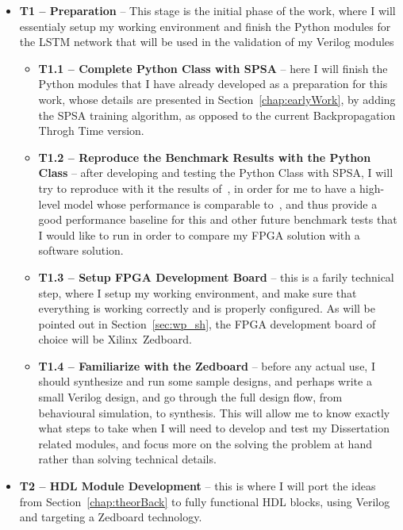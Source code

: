 \begin{itemize}
    \item \textbf{T1 -- Preparation} -- This stage is the initial phase of the work, where I will essentialy setup my working environment and finish the Python modules for the LSTM network that will be used in the validation of my Verilog modules

        \begin{itemize}
            \item \textbf{T1.1 -- Complete Python Class with SPSA} -- here I will finish the Python modules that I have already developed as a preparation for this work, whose details are presented in Section~\ref{chap:earlyWork}, by adding the SPSA training algorithm, as opposed to the current Backpropagation Throgh Time version.

            \item \textbf{T1.2 -- Reproduce the Benchmark Results with the Python Class} -- after developing and testing the Python Class with SPSA, I will try to reproduce with it the results of~\cite{Tavear13}, in order for me to have a high-level model whose performance is comparable to~\cite{Tavear13, Hochreiter07}, and thus provide a good performance baseline for this and other future benchmark tests that I would like to run in order to compare my FPGA solution with a software solution.

            \item \textbf{T1.3 -- Setup FPGA Development Board} -- this is a farily technical step, where I setup my working environment, and make sure that everything is working correctly and is properly configured. As will be pointed out in Section~\ref{sec:wp_sh}, the FPGA development board of choice will be Xilinx~\textregistered Zedboard.

            \item \textbf{T1.4 -- Familiarize with the Zedboard} -- before any actual use, I should synthesize and run some sample designs, and perhaps write a small Verilog design, and go through the full design flow, from behavioural simulation, to synthesis. This will allow me to know exactly what steps to take when I will need to develop and test my Dissertation related modules, and focus more on the solving the problem at hand rather than solving technical details.
        \end{itemize}

    \item \textbf{T2 -- HDL Module Development} -- this is where I will port the ideas from Section~\ref{chap:theorBack} to fully functional HDL blocks, using Verilog and targeting a Zedboard technology.


\end{itemize}
